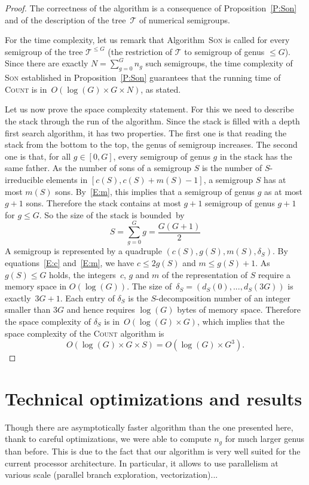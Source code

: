 \documentclass[reqno,11pt]{amsart}
\theoremstyle{plain}
\theoremstyle{definition}
\renewcommand{\leq}{\leqslant}
\begin{document}
\begin{proof}
The correctness of the algorithm is a consequence of Proposition~\ref{P:Son} and of the description of the tree~$\mathcal{T}$ of numerical semigroups.

For the time complexity, let us remark that Algorithm~\textsc{Son} is called for every semigroup of the tree $\mathcal{T}^{\leq G}$ (the restriction of $\mathcal{T}$ to semigroup of genus $\leq G$). 
Since there are exactly $N=\sum_{g=0}^G n_g$ such semigroups, the time complexity of \textsc{Son} established in Proposition~\ref{P:Son} guarantees that the running time of \textsc{Count} is in~$O(\log(G)\times G\times N)$, as stated.

Let us now prove the space complexity statement.
For  this we need to describe the stack through  the run of the algorithm.
Since the stack is filled  with a depth first search algorithm, it has two properties.
The first one is that reading the stack from the bottom to the top, the genus of  semigroup increases.  
The second one is that, for all $g\in[0,G]$, every semigroup of genus $g$ in the stack has the same father.
As the number of sons of a  semigroup $S$ is the number of $S$-irreducible elements in $[c(S),c(S)+m(S)-1]$,  a semigroup $S$ has at most $m(S)$ sons. 
By~\eqref{E:m}, this implies that a semigroup of genus $g$ as at most $g+1$ sons.
Therefore the stack contains at most $g+1$ semigroup of genus $g+1$ for $g\leq G$. 
So the size of the stack is bounded~by 
\[
S=\sum_{g=0}^Gg=\frac{G(G+1)}2
\]
A semigroup is represented by a quadruple $(c(S),g(S),m(S),\delta_S)$. 
By equations~\eqref{E:c} and~\eqref{E:m}, we have $c\leq 2g(S)$ and $m\leq g(S)+1$. 
As $g(S)\leq G$ holds, the integers~$c$, $g$  and $m$ of the representation of $S$ require a memory space in $O(\log(G))$. 
The size of~$\delta_S=(d_S(0),...,d_S(3G))$ is exactly~$3G+1$. 
Each entry of $\delta_S$ is the $S$-decomposition number of an integer smaller than $3G$ and hence
requires $\log(G)$ bytes of memory space.
Therefore the space complexity of $\delta_S$ is in~$O(\log(G)\times G)$, which implies that the space complexity of the \textsc{Count} algorithm is
\[
O(\log(G)\times G\times S)= O(\log(G)\times G^3).
\]
\end{proof}

\section{Technical optimizations and results}


Though there are asymptotically faster algorithm than the one presented here,
thank to careful optimizations, we were able to compute $n_g$ for much larger
genus than before. This is due to the fact that our algorithm is very well
suited for the current processor architecture. In particular, it allows to use
parallelism at various scale (parallel branch exploration, vectorization)...
\end{document}
